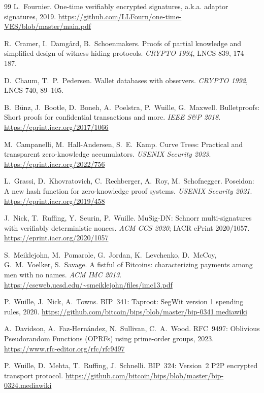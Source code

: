 \documentclass[11pt]{article}
\begin{document}
\begin{thebibliography}{99}
 L.~Fournier. One-time verifiably encrypted signatures, a.k.a. adaptor signatures, 2019. \url{https://github.com/LLFourn/one-time-VES/blob/master/main.pdf}

 R.~Cramer, I.~Damg\aa rd, B.~Schoenmakers. Proofs of partial knowledge and simplified design of witness hiding protocols. \emph{CRYPTO 1994}, LNCS 839, 174--187.

 D.~Chaum, T.~P.~Pedersen. Wallet databases with observers. \emph{CRYPTO 1992}, LNCS 740, 89--105.

 B.~B\"unz, J.~Bootle, D.~Boneh, A.~Poelstra, P.~Wuille, G.~Maxwell. Bulletproofs: Short proofs for confidential transactions and more. \emph{IEEE S\&P 2018}. \url{https://eprint.iacr.org/2017/1066}

 M.~Campanelli, M.~Hall-Andersen, S.~E.~Kamp. Curve Trees: Practical and transparent zero-knowledge accumulators. \emph{USENIX Security 2023}. \url{https://eprint.iacr.org/2022/756}

 L.~Grassi, D.~Khovratovich, C.~Rechberger, A.~Roy, M.~Schofnegger. Poseidon: A new hash function for zero-knowledge proof systems. \emph{USENIX Security 2021}. \url{https://eprint.iacr.org/2019/458}

 J.~Nick, T.~Ruffing, Y.~Seurin, P.~Wuille. MuSig-DN: Schnorr multi-signatures with verifiably deterministic nonces. \emph{ACM CCS 2020}; IACR ePrint 2020/1057. \url{https://eprint.iacr.org/2020/1057}

 S.~Meiklejohn, M.~Pomarole, G.~Jordan, K.~Levchenko, D.~McCoy, G.~M.~Voelker, S.~Savage. A fistful of Bitcoins: characterizing payments among men with no names. \emph{ACM IMC 2013}. \url{https://cseweb.ucsd.edu/~smeiklejohn/files/imc13.pdf}

 P.~Wuille, J.~Nick, A.~Towns. BIP~341: Taproot: SegWit version 1 spending rules, 2020. \url{https://github.com/bitcoin/bips/blob/master/bip-0341.mediawiki}

 A.~Davidson, A.~Faz-Hern\'andez, N.~Sullivan, C.~A.~Wood. RFC~9497: Oblivious Pseudorandom Functions (OPRFs) using prime-order groups, 2023. \url{https://www.rfc-editor.org/rfc/rfc9497}

 P.~Wuille, D.~Mehta, T.~Ruffing, J.~Schnelli. BIP~324: Version~2 P2P encrypted transport protocol. \url{https://github.com/bitcoin/bips/blob/master/bip-0324.mediawiki}


\end{thebibliography}
\end{document}
